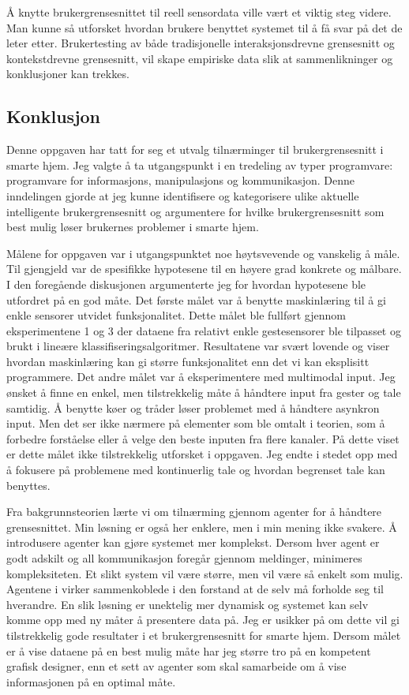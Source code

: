 Å knytte brukergrensesnittet til reell sensordata ville vært et viktig steg videre. Man kunne så utforsket hvordan brukere benyttet systemet til å få svar på det de leter etter. Brukertesting av både tradisjonelle interaksjonsdrevne grensesnitt og kontekstdrevne grensesnitt, vil skape empiriske data slik at sammenlikninger og konklusjoner kan trekkes.\\

\subsection{Konklusjon}
Denne oppgaven har tatt for seg et utvalg tilnærminger til brukergrensesnitt i smarte hjem. Jeg valgte å ta utgangspunkt i en tredeling av typer programvare: programvare for informasjons, manipulasjons og kommunikasjon. Denne inndelingen gjorde at jeg kunne identifisere og kategorisere ulike aktuelle intelligente brukergrensesnitt og argumentere for hvilke brukergrensesnitt som best mulig løser brukernes problemer i smarte hjem. 

Målene for oppgaven var i utgangspunktet noe høytsvevende og vanskelig å måle. Til gjengjeld var de spesifikke hypotesene til en høyere grad konkrete og målbare. I den foregående diskusjonen argumenterte jeg for hvordan hypotesene ble utfordret på en god måte. Det første målet var å benytte maskinlæring til å gi enkle sensorer utvidet funksjonalitet. Dette målet ble fullført gjennom eksperimentene 1 og 3 der dataene fra relativt enkle gestesensorer ble tilpasset og brukt i lineære klassifiseringsalgoritmer. Resultatene var svært lovende og viser hvordan maskinlæring kan gi større funksjonalitet enn det vi kan eksplisitt programmere. Det andre målet var å eksperimentere med multimodal input. Jeg ønsket å finne en enkel, men tilstrekkelig måte å håndtere input fra gester og tale samtidig. Å benytte køer og tråder løser problemet med å håndtere asynkron input. Men det ser ikke nærmere på elementer som ble omtalt i teorien, som å forbedre forståelse eller å velge den beste inputen fra flere kanaler. På dette viset er dette målet ikke tilstrekkelig utforsket i oppgaven. Jeg endte i stedet opp med å fokusere på problemene med kontinuerlig tale og hvordan begrenset tale kan benyttes.

Fra bakgrunnsteorien lærte vi om tilnærming gjennom agenter for å håndtere grensesnittet. Min løsning er også her enklere, men i min mening ikke svakere. Å introdusere agenter kan gjøre systemet mer komplekst. Dersom hver agent er godt adskilt og all kommunikasjon foregår gjennom meldinger, minimeres kompleksiteten. Et slikt system vil være større, men vil være så enkelt som mulig. Agentene i \citet{ishizaki96} virker sammenkoblede i den forstand at de selv må forholde seg til hverandre. En slik løsning er unektelig mer dynamisk og systemet kan selv komme opp med ny måter å presentere data på. Jeg er usikker på om dette vil gi tilstrekkelig gode resultater i et brukergrensesnitt for smarte hjem. Dersom målet er å vise dataene på en best mulig måte har jeg større tro på en kompetent grafisk designer, enn et sett av agenter som skal samarbeide om å vise informasjonen på en optimal måte.

